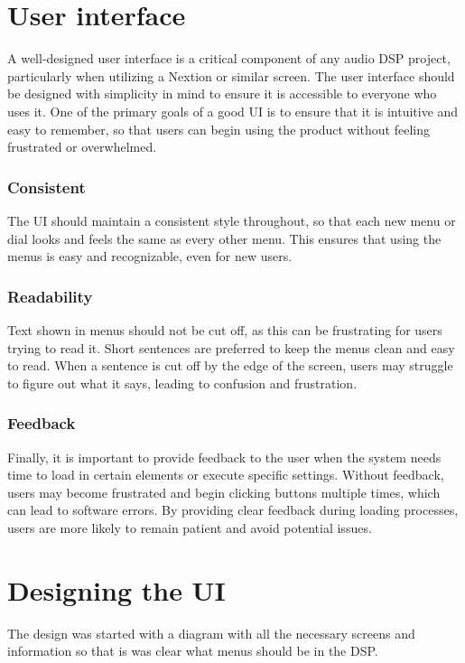 \section{User interface}
A well-designed user interface is a critical component of any audio DSP project, particularly when utilizing a Nextion or similar screen. The user interface should be designed with simplicity in mind to ensure it is accessible to everyone who uses it. One of the primary goals of a good UI is to ensure that it is intuitive and easy to remember, so that users can begin using the product without feeling frustrated or overwhelmed.

\subsubsection*{Consistent}
The UI should maintain a consistent style throughout, so that each new menu or dial looks and feels the same as every other menu. This ensures that using the menus is easy and recognizable, even for new users.

\subsubsection*{Readability}
Text shown in menus should not be cut off, as this can be frustrating for users trying to read it. Short sentences are preferred to keep the menus clean and easy to read. When a sentence is cut off by the edge of the screen, users may struggle to figure out what it says, leading to confusion and frustration.

\subsubsection*{Feedback}
Finally, it is important to provide feedback to the user when the system needs time to load in certain elements or execute specific settings. Without feedback, users may become frustrated and begin clicking buttons multiple times, which can lead to software errors. By providing clear feedback during loading processes, users are more likely to remain patient and avoid potential issues.

\section{Designing the UI}
The design was started with a diagram with all the necessary screens and information so that is was clear what menus should be in the DSP. 

